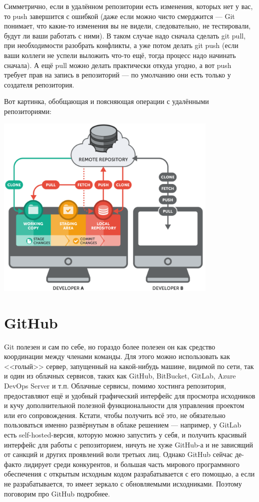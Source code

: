 \documentclass{../text-style}
\begin{document}
Симметрично, если в удалённом репозитории есть изменения, которых нет у вас, то push завершится с ошибкой (даже если можно чисто смерджится --- Git понимает, что какие-то изменения вы не видели, следовательно, не тестировали, будут ли ваши работать с ними). В таком случае надо сначала сделать git pull, при необходимости разобрать конфликты, а уже потом делать git push (если ваши коллеги не успели выложить что-то ещё, тогда процесс надо начинать сначала). А ещё pull можно делать практически откуда угодно, а вот push требует прав на запись в репозиторий --- по умолчанию они есть только у создателя репозитория.

Вот картинка, обобщающая и поясняющая операции с удалёнными репозиториями:

\begin{center}
    \includegraphics[width=0.8\textwidth]{remoteRepos.png}
\end{center}

\section{GitHub}

Git полезен и сам по себе, но гораздо более полезен он как средство координации между членами команды. Для этого можно использовать как <<голый>> сервер, запущенный на какой-нибудь машине, видимой по сети, так и один из облачных сервисов, таких как GitHub, BitBucket, GitLab, Azure DevOps Server и т.п. Облачные сервисы, помимо хостинга репозитория, предоставляют ещё и удобный графический интерфейс для просмотра исходников и кучу дополнительной полезной функциональности для управления проектом или его сопровождения. Кстати, чтобы получить всё это, не обязательно пользоваться именно развёрнутым в облаке решением --- например, у GitLab есть self-hosted-версия, которую можно запустить у себя, и получить красивый интерфейс для работы с репозиторием, ничуть не хуже GitHub-а и не зависящий от санкций и других проявлений воли третьих лиц. Однако GitHub сейчас де-факто лидирует среди конкурентов, и большая часть мирового программного обеспечения с открытым исходным кодом разрабатывается с его помощью, а если не разрабатывается, то имеет зеркало с обновляемыми исходниками. Поэтому поговорим про GitHub подробнее.
\end{document}
